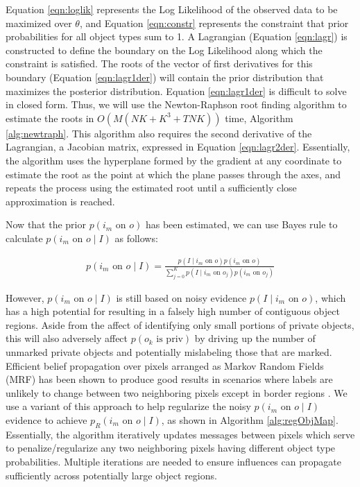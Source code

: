 \documentclass[11pt]{article}
\begin{document}
Equation \ref{eqn:loglik} represents the Log Likelihood of the observed data to be maximized over $\theta$, and Equation \ref{eqn:constr} represents the constraint that prior probabilities for all object types sum to 1.  A Lagrangian (Equation \ref{eqn:lagr}) is constructed to define the boundary on the Log Likelihood along which the constraint is satisfied.  The roots of the vector of first derivatives for this boundary (Equation \ref{eqn:lagr1der}) will contain the prior distribution that maximizes the posterior distribution.  Equation \ref{eqn:lagr1der} is difficult to solve in closed form. Thus, we will use the Newton-Raphson root finding algorithm to estimate the roots in $O(M(NK + K^3 + TNK))$ time, Algorithm \ref{alg:newtraph}.  This algorithm also requires the second derivative of the Lagrangian, a Jacobian matrix, expressed in Equation \ref{eqn:lagr2der}.  Essentially, the algorithm uses the hyperplane formed by the gradient at any coordinate to estimate the root as the point at which the plane passes through the axes, and repeats the process using the estimated root until a sufficiently close approximation is reached.

Now that the prior $p(i_m \textrm{ on } o)$ has been estimated, we can use Bayes rule to calculate $p(i_m \textrm{ on } o \mid I)$ as follows:

\begin{align}
    p(i_m \textrm{ on } o \mid I) = 
	    \frac{p(I \mid i_m \textrm{ on } o) p(i_m \textrm{ on } o)}{\sum_{j=0}^{K} p(I \mid i_m \textrm{ on } o_j) p(i_m \textrm{ on } o_j)}    
\end{align}

However, $p(i_m \textrm{ on } o \mid I)$ is still based on noisy evidence $p(I \mid i_m \textrm{ on } o)$, which has a high potential for resulting in a falsely high number of contiguous object regions.  Aside from the affect of identifying only small portions of private objects, this will also adversely affect $p(o_k \textrm{ is priv})$ by driving up the number of unmarked private objects and potentially mislabeling those that are marked.  Efficient belief propagation over pixels arranged as Markov Random Fields (MRF) has been shown to produce good results in scenarios where labels are unlikely to change between two neighboring pixels except in border regions \cite{felzenszwalb2006efficient}.  We use a variant of this approach to help regularize the noisy $p(i_m \textrm{ on } o \mid I)$ evidence to achieve $p_R(i_m \textrm{ on } o \mid I)$, as shown in Algorithm \ref{alg:regObjMap}.  Essentially, the algorithm iteratively updates messages between pixels which serve to penalize/regularize any two neighboring pixels having different object type probabilities.  Multiple iterations are needed to ensure influences can propagate sufficiently across potentially large object regions.
\end{document}

